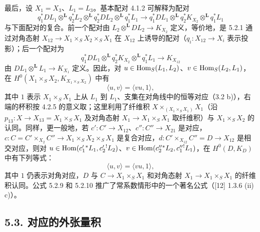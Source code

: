 最后，设 $X_1=X_3$、$L_1=L_3$。基本配对 4.1.2 可解释为配对
\begin{equation}
\tag{5.2.7}
q_1^*DL_1\otimes^{\mathbf L}q_2^*L_2\otimes^{\mathbf L}q_2^*DL_2\otimes^{\mathbf L}q_1^*L_1
\longrightarrow
q_1^*DL_1\otimes^{\mathbf L}q_2^*K_{X_2}\otimes^{\mathbf L}q_1^*L_1
\end{equation}
与下面配对的复合。前一个配对由 $L_2\otimes^{\mathbf L}DL_2\to K_{X_2}$ 定义，等价地，是 5.2.1 通过对角态射 $X_{12}\to X_1\times_SX_2\times_SX_1$ 在 $X_{12}$ 上诱导的配对（$q_i:X_{12}\to X_i$ 表示投影）；后一个配对为
\begin{equation}
\tag{5.2.8}
q_1^*DL_1\otimes^{\mathbf L}q_2^*K_{X_2}\otimes^{\mathbf L}q_1^*L_1\longrightarrow K_{X_{12}}
\end{equation}
由 $DL_1\otimes^{\mathbf L}L_1\to K_{X_1}$ 定义。因此，对 $u\in\operatorname{Hom}_S(L_1,L_2)$、$v\in\operatorname{Hom}_S(L_2,L_1)$，在 $H^0(X_1\times_SX_2,K_{X_1\times_SX_2})$ 中有
\begin{equation}
\tag{5.2.9}
\langle u,v\rangle=\langle vu,1\rangle,
\end{equation}
其中 $1$ 表示 $X_1\times_SX_1$ 上从 $L_1$ 到 $L_1$、支集在对角线中的恒等对应（3.2 b)），右端的杯积按 4.2.5 的意义取；这里利用了纤维积 $X\times_{(X_1\times_SX_1)}X_1$（沿 $p_{13}:X\to X_{13}=X_1\times_SX_1$ 及对角态射 $X_1\to X_1\times_SX_1$ 取纤维积）与 $X_1\times_SX_2$ 的认同。同样，更一般地，若 $c':C'\to X_{12}$、$c'':C''\to X_{21}$ 是对应，$c:C=C'\times_{X_2}C''\to X_1\times_SX_2\times_SX_1$ 是复合对应，$d:C'\times_{X_{12}}C''=D\to X_{12}$ 是相交对应，则对 $u\in\operatorname{Hom}(c_1'{}^*L_1,c_2'{}^!L_2)$、$v\in\operatorname{Hom}(c_2''{}^*L_2,c_1''{}^!L_1)$，在 $H^0(D,K_D)$ 中有下列等式：
\begin{equation}
\tag{5.2.10}
\langle u,v\rangle=\langle vu,1\rangle,
\end{equation}
其中 $1$ 仍表示对角对应，$D$ 与 $C\to X_1\times_SX_1$ 和对角态射 $X_1\to X_1\times_SX_1$ 的纤维积认同。公式 5.2.9 和 5.2.10 推广了常系数情形中的一个著名公式（[12] 1.3.6 (ii) c)）。

\subsection*{5.3. 对应的外张量积}

